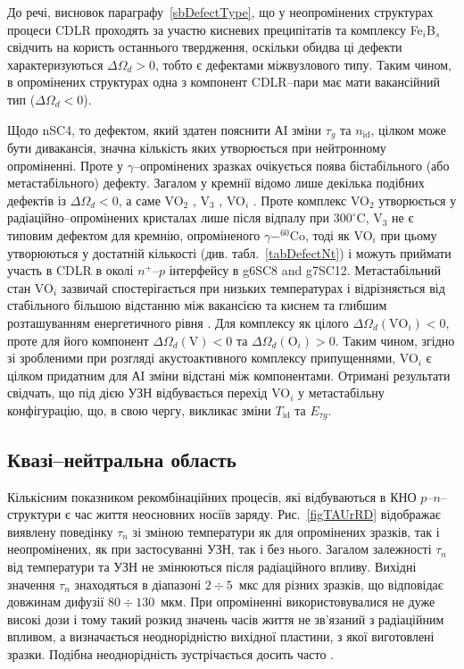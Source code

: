 До речі, висновок параграфу~\ref{sbDefectType}, що
у неопромінених структурах процеси CDLR проходять за участю кисневих преципітатів та комплексу Fe$_i$B$_s$ свідчить на користь
останнього твердження, оскільки обидва ці дефекти характеризуються $\Delta\Omega_d>0$, тобто є дефектами міжвузлового типу.
Таким чином, в опромінених структурах одна з компонент CDLR--пари
має мати вакансійний тип ($\Delta\Omega_d<0$).

Щодо nSC4, то дефектом, який здатен пояснити АІ зміни $\tau_g$ та $n_\mathrm{id}$, цілком може бути дивакансія,
значна кількість яких утворюється при нейтронному опроміненні.
Проте у $\gamma$--опромінених зразках очікується поява бістабільного (або метастабільного) дефекту.
Загалом у кремнії відомо лише декілька подібних дефектів із $\Delta\Omega_d<0$, а саме
 VO$_2$ \cite{FTP:Murin},
 V$_3$ \cite{V3:Markevich},
 VO$_i$ \cite{MetaUFN}.
Проте комплекс VO$_2$ утворюється у радіаційно--опромінених кристалах лише після відпалу при $300^\circ$C,
V$_3$ не є типовим дефектом для кремнію, опроміненого $\gamma-^{60}$Co,
тоді як VO$_i$ при цьому утворюються у достатній кількості (див. табл.~\ref{tabDefectNt}) і можуть приймати
участь в CDLR в околі $n^+$--$p$ інтерфейсу в g6SC8 and g7SC12.
Метастабільний стан VO$_i$ зазвичай спостерігається при низьких температурах
і відрізняється від стабільного більшою відстанню між вакансією та киснем та глибшим розташуванням енергетичного рівня \cite{MetaUFN}.
Для комплексу як цілого $\Delta\Omega_d(\mbox{VO}_i)<0$,
проте для його компонент $\Delta\Omega_d(\mbox{V})<0$ та $\Delta\Omega_d(\mbox{O}_i)>0$.
Таким чином, згідно зі зробленими при розгляді акустоактивного комплексу припущеннями,
VO$_i$ є цілком придатним для АІ зміни відстані між компонентами.
Отримані результати свідчать, що під дією УЗН  відбувається
перехід VO$_i$ у метастабільну конфігурацію, що, в свою чергу,
викликає зміни $T_{\mathrm{id}}$ та $E_{\tau g}$.





\subsection{Квазі--нейтральна область\label{sbRadDef}}

Кількісним показником рекомбінаційних процесів, які відбуваються в КНО $p$--$n$--структури є
час життя неосновних носіїв заряду.
Рис.~\ref{figTAUrRD} відображає виявлену поведінку $\tau_n$ зі зміною температури як для опромінених зразків,
так і неопромінених, як при застосуванні УЗН, так і без нього.
Загалом залежності $\tau_n$ від температури та УЗН не змінюються після радіаційного впливу.
Вихідні значення $\tau_n$ знаходяться в діапазоні $2\div5$~мкс для різних зразків,
що відповідає довжинам дифузії $80\div130$~мкм.
При опроміненні використовувалися не дуже високі дози і тому
такий розкид значень часів життя не зв'язаний з радіаційним впливом,
а визначається неоднорідністю вихідної пластини, з якої виготовлені зразки.
Подібна неоднорідність зустрічається досить часто \cite{Oxide:Chen,Oxide_Schon}.


